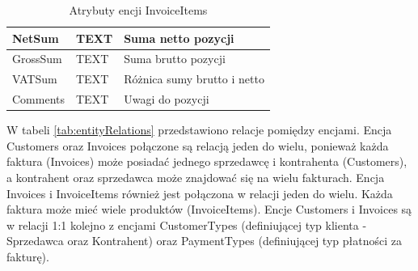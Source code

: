 \begin{table}[ht!]
{\begin{tabular}{|l|l|l|}
NetSum           & TEXT                                                              & Suma netto pozycji                                                                               \\ \hline
GrossSum         & TEXT                                                              & Suma brutto pozycji                                                                              \\ \hline
VATSum           & TEXT                                                              & Różnica sumy brutto i netto                                                                      \\ \hline
Comments         & TEXT                                                              & Uwagi do pozycji                                                                                 \\ \hline
\end{tabular}%
}
\caption{Atrybuty encji InvoiceItems}
\label{tab:InvoiceItemsAttr}
\end{table}

W tabeli \ref{tab:entityRelations} przedstawiono relacje pomiędzy encjami. Encja Customers oraz Invoices połączone są relacją jeden do wielu, ponieważ każda faktura (Invoices) może posiadać jednego sprzedawcę i kontrahenta (Customers), a kontrahent oraz sprzedawca może znajdować się na wielu fakturach. Encja Invoices i InvoiceItems również jest połączona w relacji jeden do wielu. Każda faktura może mieć wiele produktów (InvoiceItems). Encje Customers i Invoices są w relacji 1:1 kolejno z encjami CustomerTypes (definiującej typ klienta - Sprzedawca oraz Kontrahent) oraz PaymentTypes (definiującej typ płatności za fakturę).

\begin{table}[ht!]
\centering
{}
\caption{Relacje między encjami}
\label{tab:entityRelations}
\end{table}

